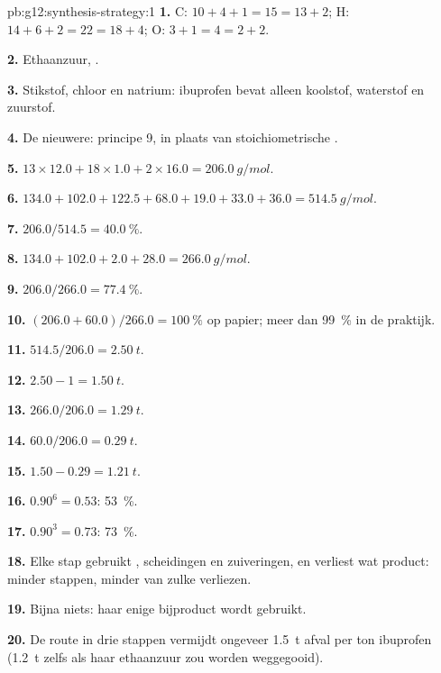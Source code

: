 \begin{solution}{pb:g12:synthesis-strategy:1}
\textbf{1.} C: $10 + 4 + 1 = 15 = 13 + 2$; H: $14 + 6 + 2 = 22 = 18 + 4$;
O: $3 + 1 = 4 = 2 + 2$.

\textbf{2.} Ethaanzuur, .

\textbf{3.} Stikstof, chloor en natrium: ibuprofen bevat alleen
koolstof, waterstof en zuurstof.

\textbf{4.} De nieuwere: principe 9,  in plaats van
stoichiometrische .

\textbf{5.} $13 \times 12.0 + 18 \times 1.0 + 2 \times 16.0 =
\qty{206.0}{g/mol}$.

\textbf{6.} $134.0 + 102.0 + 122.5 + 68.0 + 19.0 + 33.0 + 36.0 =
\qty{514.5}{g/mol}$.

\textbf{7.} $206.0/514.5 = \qty{40.0}{\percent}$.

\textbf{8.} $134.0 + 102.0 + 2.0 + 28.0 = \qty{266.0}{g/mol}$.

\textbf{9.} $206.0/266.0 = \qty{77.4}{\percent}$.

\textbf{10.} $(206.0 + 60.0)/266.0 = \qty{100}{\percent}$ op papier; meer
dan \qty{99}{\percent} in de praktijk.

\textbf{11.} $514.5/206.0 = \qty{2.50}{t}$.

\textbf{12.} $2.50 - 1 = \qty{1.50}{t}$.

\textbf{13.} $266.0/206.0 = \qty{1.29}{t}$.

\textbf{14.} $60.0/206.0 = \qty{0.29}{t}$.

\textbf{15.} $1.50 - 0.29 = \qty{1.21}{t}$.

\textbf{16.} $0.90^6 = 0.53$: \qty{53}{\percent}.

\textbf{17.} $0.90^3 = 0.73$: \qty{73}{\percent}.

\textbf{18.} Elke stap gebruikt , scheidingen en
zuiveringen, en verliest wat product: minder stappen, minder van zulke
verliezen.

\textbf{19.} Bijna niets: haar enige bijproduct wordt gebruikt.

\textbf{20.} De route in drie stappen vermijdt ongeveer \qty{1.5}{t}
afval per ton ibuprofen (\qty{1.2}{t} zelfs als haar ethaanzuur zou
worden weggegooid).
\end{solution}
